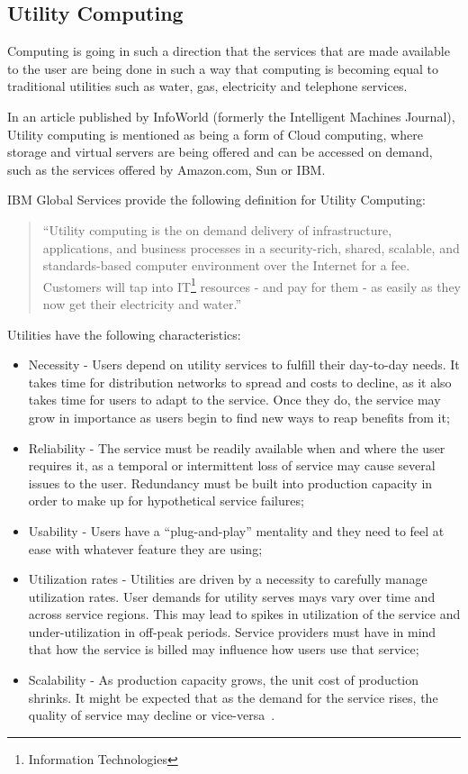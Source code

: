 \subsection{Utility Computing} \label{utility}

Computing is going in such a direction that the services that are made available to the user are being done in such a way that computing is becoming equal to traditional utilities such as water, gas, electricity and telephone services.\cite{Buyya2009599}

In an article published by InfoWorld (formerly the Intelligent Machines Journal), Utility computing is mentioned as being a form of Cloud computing, where storage and virtual servers are being offered and can be accessed on demand, such as the services offered by Amazon.com, Sun or IBM. \cite{grids-and-clouds}

IBM Global Services provide the following definition for Utility Computing:

\begin{quote}
``Utility computing is the on demand delivery of infrastructure, applications, and business processes in a security-rich, shared, scalable, and standards-based computer environment over the Internet for a fee. Customers will tap into IT\footnote{Information Technologies} resources - and pay for them - as easily as they now get their electricity and water.''~\cite{ibm-utility}
\end{quote}

Utilities have the following characteristics:
\begin{itemize}
\item Necessity - Users depend on utility services to fulfill their day-to-day needs. It takes time for distribution networks to spread and costs to decline, as it also takes time for users to adapt to the service. Once they do, the service may grow in importance as users begin to find new ways to reap benefits from it;
\item Reliability - The service must be readily available when and where the user requires it, as a temporal or intermittent loss of service may cause several issues to the user. Redundancy must be built into production capacity in order to make up for hypothetical service failures;
\item Usability - Users have a ``plug-and-play'' mentality and they need to feel at ease with whatever feature they are using;
\item Utilization rates - Utilities are driven by a necessity to carefully manage utilization rates. User demands for utility serves mays vary over time and across service regions. This may lead to spikes in utilization of the service and under-utilization in off-peak periods. Service providers must have in mind that how the service is billed may influence how users use that service;
\item Scalability - As production capacity grows, the unit cost of production shrinks. It might be expected that as the demand for the service rises, the quality of service may decline or vice-versa~\cite{ibm-utility}.
\end{itemize}

